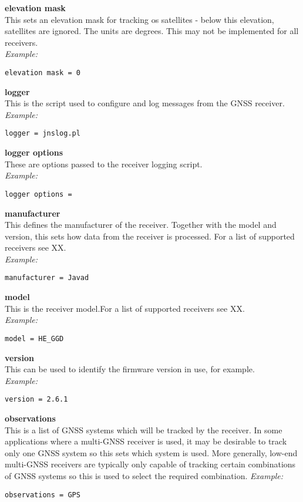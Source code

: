 {\bfseries elevation mask}\\
This sets an elevation mask for tracking os satellites - below this elevation, satellites
are ignored. The units are degrees. This may not be implemented for all receivers.\\
\textit{Example:}
\begin{lstlisting}
elevation mask = 0
\end{lstlisting}

{\bfseries logger}\\
This is the script used to configure and log messages from the GNSS receiver.\\
\textit{Example:}
\begin{lstlisting}
logger = jnslog.pl
\end{lstlisting}

{\bfseries logger options}\\
These are options passed to the receiver logging script.\\
\textit{Example:}
\begin{lstlisting}
logger options =
\end{lstlisting}

{\bfseries manufacturer}\\
This defines the manufacturer of the receiver. Together with the model and version, 
this sets how data from the receiver is processed. For a list of supported receivers
see XX.\\
\textit{Example:}
\begin{lstlisting}
manufacturer = Javad
\end{lstlisting}

{\bfseries model}\\
This is the receiver model.For a list of supported receivers
see XX.\\
\textit{Example:}
\begin{lstlisting}
model = HE_GGD
\end{lstlisting}

{\bfseries version}\\
This can be used to identify the firmware version in use, for example.\\
\textit{Example:}
\begin{lstlisting}
version = 2.6.1
\end{lstlisting}

{\bfseries observations}\\
This is a list of GNSS systems which will be tracked by the receiver. 
In some applications where a multi-GNSS receiver is used, it may be desirable to track
only one GNSS system so this sets which system is used.
More generally, low-end multi-GNSS receivers are typically only capable of tracking
certain combinations of GNSS systems so this is used to select the required combination.
\textit{Example:}
\begin{lstlisting}
observations = GPS
\end{lstlisting}

